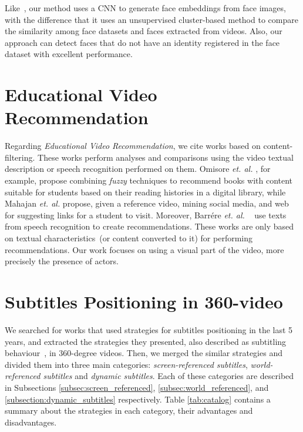 Like~\cite{globofacestream, yang2017neural, rao2017attention, sohn2017unsupervised}, our method uses a CNN to generate face embeddings from face images, with the difference that it uses an unsupervised cluster-based method to compare the similarity among face datasets and faces extracted from videos. Also, our approach can detect faces that do not have an identity registered in the face dataset with excellent performance.

\section{Educational Video Recommendation}
\label{sec:recommendation}

Regarding \textit{Educational Video Recommendation}, we cite works based on content-filtering.
These works perform analyses and comparisons using the video textual description or speech recognition performed on them. 
Omisore \textit{et. al.} \cite{omisore2014personalized}, for example, propose combining \textit{fuzzy} techniques to recommend books with content suitable for students based on their reading histories in a digital library, while Mahajan \textit{et. al.} \cite{mahajan2015optimising} propose, given a reference video,  mining social media, and web for suggesting links for a student to visit.
Moreover, Barrére \textit{et. al.}
~\cite{barrere2020utilizaccao} use texts from speech recognition to create recommendations.
These works are only based on textual characteristics~(or content converted to it) for performing recommendations.
Our work focuses on using a visual part of the video, more precisely the presence of actors.


\section{Subtitles Positioning in 360-video}
\label{sec:subtitles}

We searched for works that used strategies for subtitles positioning in the last 5 years, and extracted the strategies they presented, also described as subtitling behaviour~\cite{brown_subtitles_2017}, in 360-degree videos. Then, we merged the similar strategies and divided them into three main categories: \emph{screen-referenced subtitles}, \emph{world-referenced subtitles} and \emph{dynamic subtitles}. Each of these categories are described in Subsections \ref{subsec:screen_referenced}, \ref{subsec:world_referenced}, and \ref{subsection:dynamic_subtitles} respectively. Table \ref{tab:catalog} contains a summary about the strategies in each category, their advantages and disadvantages.

